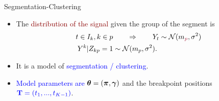 \documentclass{beamer}\usepackage[]{graphicx}\usepackage[]{color}
\newcommand{\blue}[1]{\textcolor{blue}{#1}}
\newcommand{\emphase}[1]{\textcolor{darkred}{#1}}
\newcommand{\Ncal}{\mathcal{N}}
\newcommand{\Tbf}{{\bf T}}
\newcommand{\pibf}{\mbox{\mathversion{bold}{$\pi$}}}
\newcommand{\gammabf}{\mbox{\mathversion{bold}{$\gamma$}}}
\newcommand{\thetabf}{\mbox{\mathversion{bold}{$\theta$}}}
\begin{document}
\begin{frame}{Segmentation-Clustering}
 \begin{itemize}
 \item The \emphase{distribution of the signal} given the group of the
     segment is
   \begin{align*}
    t \in I_k, k \in p &\qquad \Rightarrow \qquad Y_t \sim
    \Ncal(m_{\emphase{p}}, \sigma^2)\\
    Y^k|Z_{kp}=1 &\sim \Ncal( m_p, \sigma^2 ).
    \end{align*}
 \item It is a model of \blue{segmentation / clustering}.
 \pause
  \item \blue{Model parameters are $\thetabf =(\pibf, \gammabf)$} and 
  the breakpoint positions $\blue{\Tbf = (t_1, ..., t_{K-1})}$.
\end{itemize}
\end{frame} 
% 
% 
\end{document}
